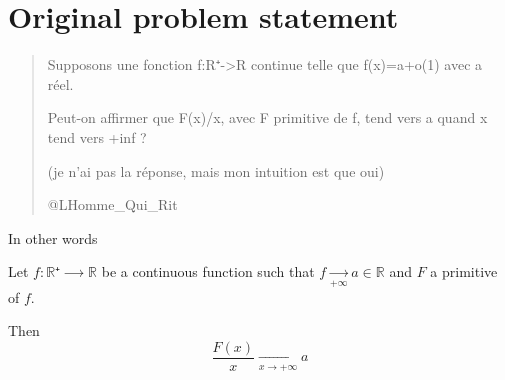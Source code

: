 \documentclass[a4paper, 11pt]{article}
\title{\titlepagetitle}
\author{}
\date{\docdate}
\begin{document}
\maketitle
\thispagestyle{main}

\section{Original problem statement}
\foreignblockquote{french}[@LHomme\_Qui\_Rit]{
    Supposons une fonction f:R⁺->R continue telle que f(x)=a+o(1) avec a réel.

    Peut-on affirmer que F(x)/x, avec F primitive de f, tend vers a quand x tend vers +inf ?

    (je n'ai pas la réponse, mais mon intuition est que oui)
}

In other words
\begin{prop}\label{prop|original}
    Let $f:ℝ⁺⟶ℝ$ be a continuous function such that $f \xrightarrow[+∞]{} a ∈ ℝ$ and $F$ a primitive of $f$.

    Then
    \begin{equation}
        \frac{F(x)}{x} \xrightarrow[x→+∞]{} a
    \end{equation}
\end{prop}
\end{document}
